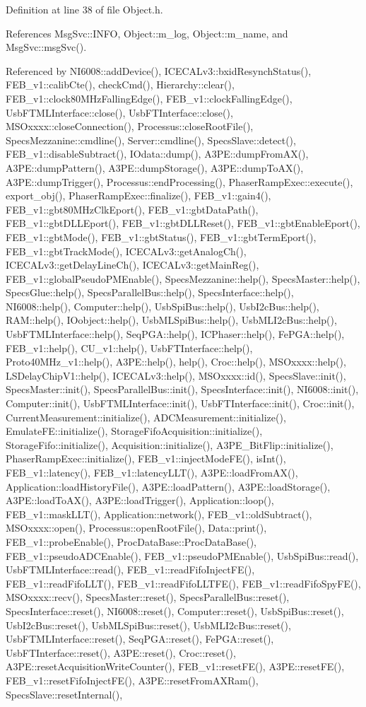 Definition at line 38 of file Object.h.

References MsgSvc::INFO, Object::m\_\-log, Object::m\_\-name, and MsgSvc::msgSvc().

Referenced by NI6008::addDevice(), ICECALv3::bxidResynchStatus(), FEB\_\-v1::calibCte(), checkCmd(), Hierarchy::clear(), FEB\_\-v1::clock80MHzFallingEdge(), FEB\_\-v1::clockFallingEdge(), UsbFTMLInterface::close(), UsbFTInterface::close(), MSOxxxx::closeConnection(), Processus::closeRootFile(), SpecsMezzanine::cmdline(), Server::cmdline(), SpecsSlave::detect(), FEB\_\-v1::disableSubtract(), IOdata::dump(), A3PE::dumpFromAX(), A3PE::dumpPattern(), A3PE::dumpStorage(), A3PE::dumpToAX(), A3PE::dumpTrigger(), Processus::endProcessing(), PhaserRampExec::execute(), export\_\-obj(), PhaserRampExec::finalize(), FEB\_\-v1::gain4(), FEB\_\-v1::gbt80MHzClkEport(), FEB\_\-v1::gbtDataPath(), FEB\_\-v1::gbtDLLEport(), FEB\_\-v1::gbtDLLReset(), FEB\_\-v1::gbtEnableEport(), FEB\_\-v1::gbtMode(), FEB\_\-v1::gbtStatus(), FEB\_\-v1::gbtTermEport(), FEB\_\-v1::gbtTrackMode(), ICECALv3::getAnalogCh(), ICECALv3::getDelayLineCh(), ICECALv3::getMainReg(), FEB\_\-v1::globalPseudoPMEnable(), SpecsMezzanine::help(), SpecsMaster::help(), SpecsGlue::help(), SpecsParallelBus::help(), SpecsInterface::help(), NI6008::help(), Computer::help(), UsbSpiBus::help(), UsbI2cBus::help(), RAM::help(), IOobject::help(), UsbMLSpiBus::help(), UsbMLI2cBus::help(), UsbFTMLInterface::help(), SeqPGA::help(), ICPhaser::help(), FePGA::help(), FEB\_\-v1::help(), CU\_\-v1::help(), UsbFTInterface::help(), Proto40MHz\_\-v1::help(), A3PE::help(), help(), Croc::help(), MSOxxxx::help(), LSDelayChipV1::help(), ICECALv3::help(), MSOxxxx::id(), SpecsSlave::init(), SpecsMaster::init(), SpecsParallelBus::init(), SpecsInterface::init(), NI6008::init(), Computer::init(), UsbFTMLInterface::init(), UsbFTInterface::init(), Croc::init(), CurrentMeasurement::initialize(), ADCMeasurement::initialize(), EmulateFE::initialize(), StorageFifoAcquisition::initialize(), StorageFifo::initialize(), Acquisition::initialize(), A3PE\_\-BitFlip::initialize(), PhaserRampExec::initialize(), FEB\_\-v1::injectModeFE(), isInt(), FEB\_\-v1::latency(), FEB\_\-v1::latencyLLT(), A3PE::loadFromAX(), Application::loadHistoryFile(), A3PE::loadPattern(), A3PE::loadStorage(), A3PE::loadToAX(), A3PE::loadTrigger(), Application::loop(), FEB\_\-v1::maskLLT(), Application::network(), FEB\_\-v1::oldSubtract(), MSOxxxx::open(), Processus::openRootFile(), Data::print(), FEB\_\-v1::probeEnable(), ProcDataBase::ProcDataBase(), FEB\_\-v1::pseudoADCEnable(), FEB\_\-v1::pseudoPMEnable(), UsbSpiBus::read(), UsbFTMLInterface::read(), FEB\_\-v1::readFifoInjectFE(), FEB\_\-v1::readFifoLLT(), FEB\_\-v1::readFifoLLTFE(), FEB\_\-v1::readFifoSpyFE(), MSOxxxx::recv(), SpecsMaster::reset(), SpecsParallelBus::reset(), SpecsInterface::reset(), NI6008::reset(), Computer::reset(), UsbSpiBus::reset(), UsbI2cBus::reset(), UsbMLSpiBus::reset(), UsbMLI2cBus::reset(), UsbFTMLInterface::reset(), SeqPGA::reset(), FePGA::reset(), UsbFTInterface::reset(), A3PE::reset(), Croc::reset(), A3PE::resetAcquisitionWriteCounter(), FEB\_\-v1::resetFE(), A3PE::resetFE(), FEB\_\-v1::resetFifoInjectFE(), A3PE::resetFromAXRam(), SpecsSlave::resetInternal(), 
